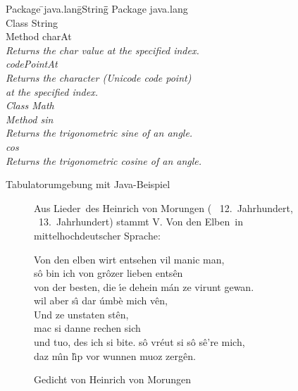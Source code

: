 \documentclass[a4paper, 12pt]{article} %
\begin{document}
\begin{table}[t]
\begin{tabbing}
    \centering
    Package \=\sffamily java.lang\=\sffamily String\=\hspace*{5mm}\=\kill
    Package \>\sffamily java.lang\\
    Class \>\> \sffamily String\\
    Method \>\>\> \sffamily charAt\+\+\+\\
    \>\itshape Returns the char value at the specified index.\\
    \sffamily codePointAt\\
    \>\itshape Returns the character (Unicode code point)\\
    \>\itshape at the specified index.\\
    \<\<\< Class \>\>\sffamily Math\\
    \<\<\< Method \>\>\>\sffamily sin\\
    \>\itshape Returns the trigonometric sine of an angle.\\
    \sffamily cos\\
    \>\itshape Returns the trigonometric cosine of an angle.\\
\end{tabbing}
\caption{Tabulatorumgebung mit Java-Beispiel}\label{java-tab}
\end{table}

\begin{figure}[b]
Aus \flqq Lieder\frqq\ des Heinrich von Morungen (\textasteriskcentered 
~12.~Jahrhundert, \textdagger ~13.~Jahrhundert) stammt \flqq V. Von den Elben\frqq\
in mittelhochdeutscher Sprache:\par\medskip\noindent
\glqq Von den elben wirt entsehen vil manic man,\\
\hspace*{2ex} s\^{o} bin ich von gr\^{o}zer lieben ents\^{e}n \\
von der besten, die \'{\i}e dehein m\'{a}n ze virunt gewan.\\
\hspace*{2ex} wil aber s\^{\i} dar \'{u}mb\`{e} mich v\^{e}n,\\
\hspace*{2ex} Und ze unstaten st\^{e}n,\\
\hspace*{4ex} mac si danne rechen sich\\
\hspace*{4ex} und tuo, des ich si bite. s\^{o} vr\'{e}ut si
s\^{o} s\^{e}\textquoteright re mich,\\
\hspace*{2ex} daz m\^{\i}n l\^{\i}p vor wunnen muoz zerg\^{e}n.\grqq\par\bigskip
\caption{Gedicht von Heinrich von Morungen}\label{Heinrich-Gedicht}
\end{figure}
\end{document}
